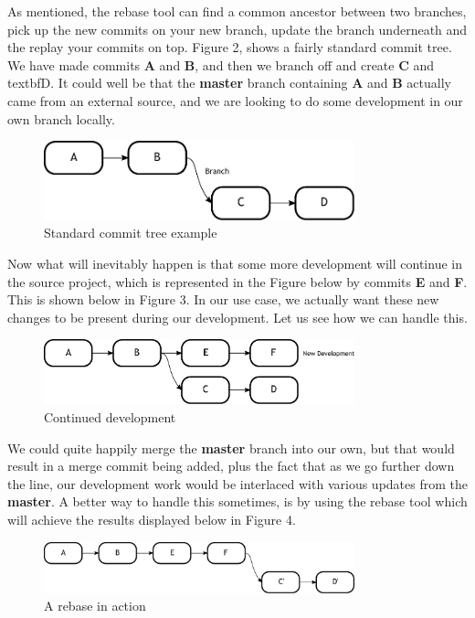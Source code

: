 As mentioned, the rebase tool can find a common ancestor between two branches, pick up the new commits on your new branch, update the branch underneath and the replay your commits on top.
Figure 2, shows a fairly standard commit tree.
We have made commits \textbf{A} and \textbf{B}, and then we branch off and create \textbf{C} and textbf{D}.
It could well be that the \textbf{master} branch containing \textbf{A} and \textbf{B} actually came from an external source, and we are looking to do some development in our own branch locally.

\begin{figure}[hbt]
\centering
\includegraphics[width=9cm]{images/f-w7-d2.pdf}
\caption{Standard commit tree example}
\end{figure}

Now what will inevitably happen is that some more development will continue in the source project, which is represented in the Figure below by commits \textbf{E} and \textbf{F}.
This is shown below in Figure 3.
In our use case, we actually want these new changes to be present during our development.
Let us see how we can handle this.

\begin{figure}[hbt]
\centering
\includegraphics[width=9cm]{images/f-w7-d3.pdf}
\caption{Continued development}
\end{figure}

We could quite happily merge the \textbf{master} branch into our own, but that would result in a merge commit being added, plus the fact that as we go further down the line, our development work would be interlaced with various updates from the \textbf{master}.
A better way to handle this sometimes, is by using the rebase tool which will achieve the results displayed below in Figure 4.

\begin{figure}[hbt]
\centering
\includegraphics[width=9cm]{images/f-w7-d4.pdf}
\caption{A rebase in action}
\end{figure}

